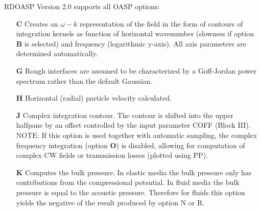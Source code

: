     RDOASP  Version 2.0 supports all OASP options:
\begin{itemize}
    \item[{\bf C}]   Creates an $ \omega - k$ representation of the field in
      the form of  contours   of  integration  kernels  as   function   of 
          horizontal   wavenumber  (slowness  if  option   {\bf B}   is 
          selected) and frequency (logarithmic y-axis). All  axis 
          parameters are determined automatically. 
    \item[{\bf G}] Rough interfaces are assumed to be characterized by
a Goff-Jordan power spectrum rather than the default Gaussian. 
	     \item[{\bf H}] Horizontal (radial) particle velocity calculated.
	     \item[{\bf J}]	Complex integration contour. The contour is 
             shifted  into the upper halfpane by an offset controlled by the 
	input parameter COFF (Block III). NOTE: If this option 
      is used together with
      automatic sampling, the complex frequency integration (option
      {\bf O}) is disabled, allowing for computation of complex CW
      fields or transmission losses (plotted using PP). 

\item[{\bf K}]
      Computes the bulk pressure. In elastic media the bulk pressure only
      has contributions from the compressional potential. In fluid
      media the bulk pressure is equal to the acoustic pressure.
      Therefore for fluids this option yields the negative of the result
      produced by option N or R.  


\end{itemize}
